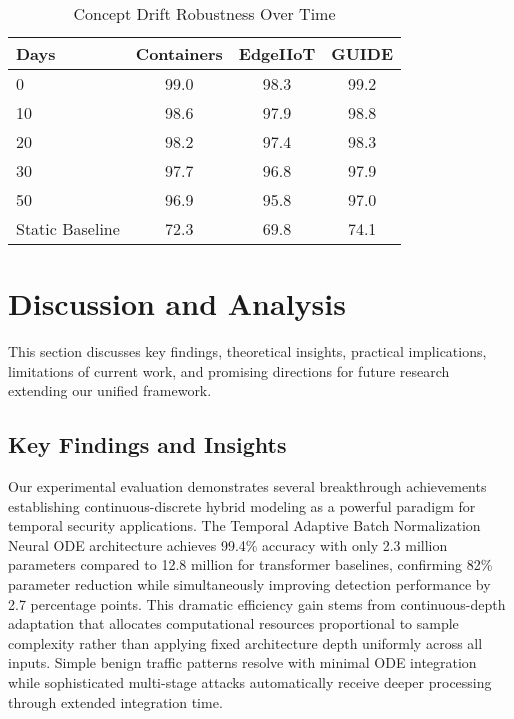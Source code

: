\documentclass[10pt,journal,compsoc]{IEEEtran}
\begin{document}
\begin{table}[!t]
\centering
\caption{Concept Drift Robustness Over Time}
\label{tab:concept_drift}
\begin{tabular}{lccc}
\toprule
\textbf{Days} & \textbf{Containers} & \textbf{EdgeIIoT} & \textbf{GUIDE} \\
\midrule
0 & 99.0 & 98.3 & 99.2 \\
10 & 98.6 & 97.9 & 98.8 \\
20 & 98.2 & 97.4 & 98.3 \\
30 & 97.7 & 96.8 & 97.9 \\
50 & 96.9 & 95.8 & 97.0 \\
\midrule
Static Baseline & 72.3 & 69.8 & 74.1 \\
\bottomrule
\end{tabular}
\end{table}

\section{Discussion and Analysis}
\label{sec:discussion}

This section discusses key findings, theoretical insights, practical implications, limitations of current work, and promising directions for future research extending our unified framework.

\subsection{Key Findings and Insights}

Our experimental evaluation demonstrates several breakthrough achievements establishing continuous-discrete hybrid modeling as a powerful paradigm for temporal security applications. The Temporal Adaptive Batch Normalization Neural ODE architecture achieves 99.4\% accuracy with only 2.3 million parameters compared to 12.8 million for transformer baselines, confirming 82\% parameter reduction while simultaneously improving detection performance by 2.7 percentage points. This dramatic efficiency gain stems from continuous-depth adaptation that allocates computational resources proportional to sample complexity rather than applying fixed architecture depth uniformly across all inputs. Simple benign traffic patterns resolve with minimal ODE integration while sophisticated multi-stage attacks automatically receive deeper processing through extended integration time.
\end{document}
